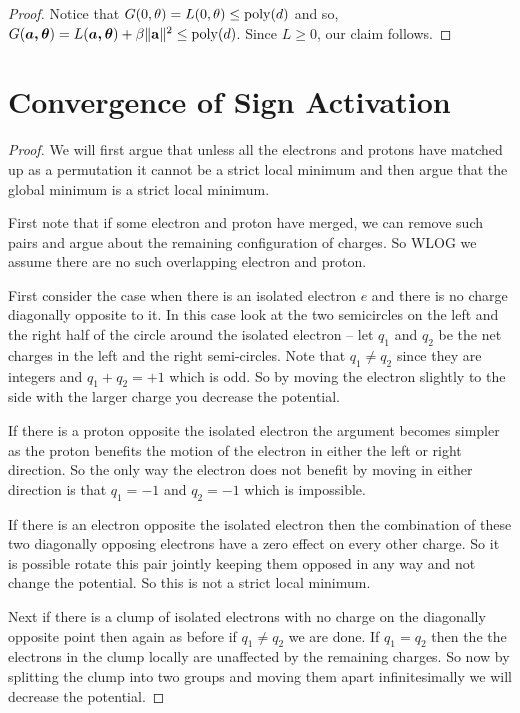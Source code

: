 \documentclass{article}
\begin{document}
\bounded*

\begin{proof}
Notice that $G(0, \bold{\theta}) = L(0,\bold{\theta}) \leq \mathrm{poly}(d)$ and so, $G(\boldsymbol{a,\theta}) = L(\boldsymbol{a,\theta}) + \beta \|{\bf a}\|^2 \leq
\mathrm{poly}(d)$. Since $L \geq 0$, our claim follows. 
\end{proof}

\section{Convergence of Sign Activation}

\signcon*

\begin{proof}
We will first argue that unless all the electrons and protons have matched up as a permutation it cannot be a strict local minimum and then argue that the global minimum is a strict local minimum.

First note that if some electron and proton have merged, we can remove such pairs and argue about the remaining configuration of charges. So WLOG we assume there are no such overlapping electron and proton.

First consider the case when there is an isolated electron $e$ and there is no charge diagonally opposite to it. In this case look at the two semicircles on the left and the right half of the circle around the isolated electron -- let $q_1$ and $q_2$ be the net charges in the left and the right semi-circles. Note that $q_1 \neq q_2$ since they are integers and $q_1 + q_2 = +1$ which is odd. So by moving the electron slightly to the side with the larger charge you decrease the potential.

If there is a proton opposite the isolated electron the argument becomes simpler as the proton benefits the motion of the electron in either the left or right direction. So  the only way the electron does not benefit by moving in either direction is that $q_1 = -1$ and $q_2 = -1$ which is impossible.

If there is an electron opposite the isolated electron then the combination of these two diagonally opposing electrons have a zero effect on every other charge. So it is possible rotate this pair jointly keeping them opposed in any way and not change the potential. So this is not a strict local minimum.

Next if there is a clump of isolated electrons with no charge on the diagonally opposite point then again as before if $q_1 \neq q_2$ we are done. If  $q_1 = q_2$ then the the electrons in the clump locally are unaffected by the remaining charges. So now by splitting the clump into two groups and moving them apart infinitesimally we will decrease the potential.


\end{proof}
\end{document}
